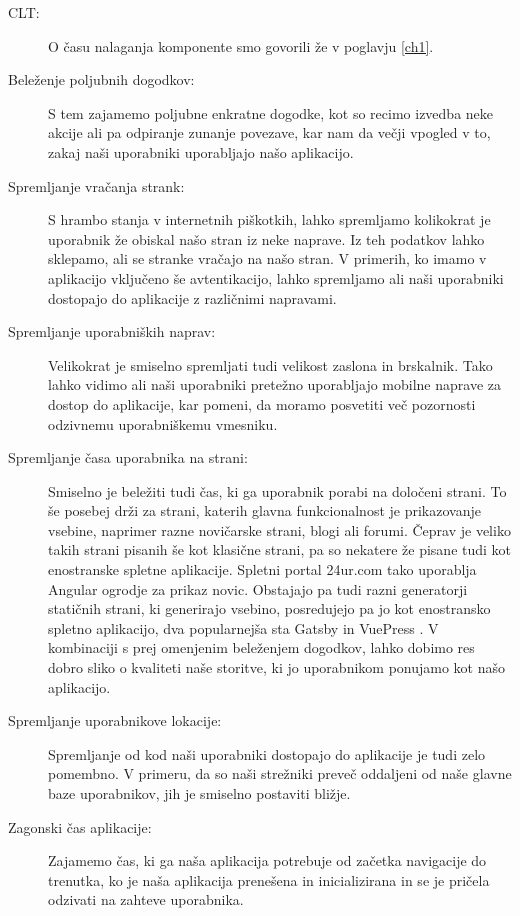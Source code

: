\documentclass[a4paper, 12pt]{book}
\begin{document}
\begin{description}
	\item[CLT:] O času nalaganja komponente smo govorili že v poglavju \ref{ch1}.
	\item[Beleženje poljubnih dogodkov:] S tem zajamemo poljubne enkratne dogodke, kot so recimo izvedba neke akcije ali pa odpiranje zunanje povezave, kar nam da večji vpogled v to, zakaj naši uporabniki uporabljajo našo aplikacijo.
	\item[Spremljanje vračanja strank:] S hrambo stanja v internetnih piškotkih, lahko spremljamo kolikokrat je uporabnik že obiskal našo stran iz neke naprave. Iz teh podatkov lahko sklepamo,  ali se stranke vračajo na našo stran. V primerih, ko imamo v aplikacijo vključeno še avtentikacijo, lahko spremljamo ali naši uporabniki dostopajo do aplikacije z različnimi napravami.
	\item[Spremljanje uporabniških naprav:] Velikokrat je smiselno spremljati tudi velikost zaslona in brskalnik. Tako lahko vidimo ali naši uporabniki pretežno uporabljajo mobilne naprave za dostop do aplikacije, kar pomeni, da moramo posvetiti več pozornosti odzivnemu uporabniškemu vmesniku.
	\item[Spremljanje časa uporabnika na strani:] Smiselno je beležiti tudi čas, ki ga uporabnik porabi na določeni strani. To še posebej drži za strani, katerih glavna funkcionalnost je prikazovanje vsebine, naprimer razne novičarske strani, blogi ali forumi. Čeprav je veliko takih strani pisanih še kot klasične strani, pa so nekatere že pisane tudi kot enostranske spletne aplikacije. Spletni portal 24ur.com tako uporablja Angular ogrodje za prikaz novic. Obstajajo pa tudi razni generatorji statičnih strani, ki generirajo vsebino, posredujejo pa jo kot enostransko spletno aplikacijo, dva popularnejša sta Gatsby \cite{gatsby_website} in VuePress \cite{vuepress_website}. V kombinaciji s prej omenjenim beleženjem dogodkov, lahko dobimo res dobro sliko o kvaliteti naše storitve, ki jo uporabnikom ponujamo kot našo aplikacijo.
	\item[Spremljanje uporabnikove lokacije:] Spremljanje od kod naši uporabniki dostopajo do aplikacije je tudi zelo pomembno. V primeru, da so naši strežniki preveč oddaljeni od naše glavne baze uporabnikov, jih je smiselno postaviti bližje.
	\item[Zagonski čas aplikacije:] Zajamemo čas, ki ga naša aplikacija potrebuje od začetka navigacije do trenutka, ko je naša aplikacija prenešena in inicializirana in se je pričela odzivati na zahteve uporabnika.

\end{description}
\end{document}
